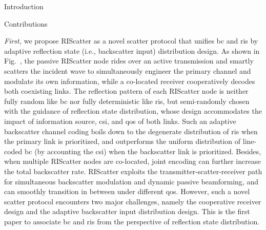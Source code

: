 \documentclass[journal]{IEEEtran}
\begin{document}
\begin{section}{Introduction}
	\begin{subsection}{Contributions}

		\emph{First,} we propose RIScatter as a novel scatter protocol that unifies \gls{bc} and \gls{ris} by adaptive reflection state (i.e., backscatter input) distribution design.
		As shown in Fig.~, the passive RIScatter node rides over an active transmission and smartly scatters the incident wave to simultaneously engineer the primary channel and modulate its own information, while a co-located receiver cooperatively decodes both coexisting links.
		The reflection pattern of each RIScatter node is neither fully random like \gls{bc} nor fully deterministic like \gls{ris}, but semi-randomly chosen with the guidance of reflection state distribution, whose design accommodates the impact of information source, \gls{csi}, and \gls{qos} of both links.
		Such an adaptive backscatter channel coding boils down to the degenerate distribution of \gls{ris} when the primary link is prioritized, and outperforms the uniform distribution of line-coded \gls{bc} (by accounting the \gls{csi}) when the backscatter link is prioritized.
		Besides, when multiple RIScatter nodes are co-located, joint encoding can further increase the total backscatter rate.
		RIScatter exploits the transmitter-scatter-receiver path for simultaneous backscatter modulation and dynamic passive beamforming, and can smoothly transition in between under different \gls{qos}.
		However, such a novel scatter protocol encounters two major challenges, namely the cooperative receiver design and the adaptive backscatter input distribution design.
		This is the first paper to associate \gls{bc} and \gls{ris} from the perspective of reflection state distribution.


\end{subsection}
\end{section}
\end{document}

